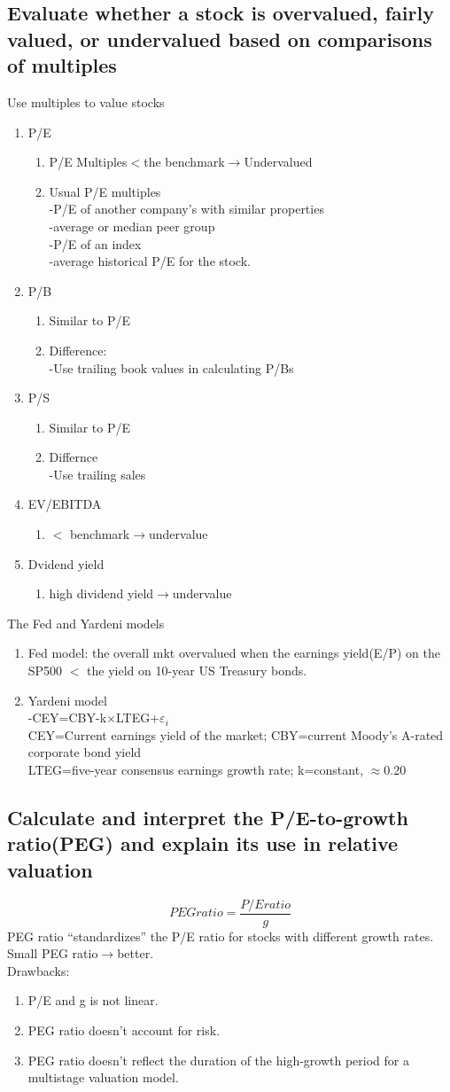 \documentclass{article}
\newcommand{\be}{\begin{enumerate}}
\newcommand{\ee}{\end{enumerate}}
\newcommand{\ra}{$\rightarrow$}
\begin{document}
\subsection{Evaluate whether a stock is overvalued, fairly valued, or undervalued based on comparisons
of multiples}
Use multiples to value stocks
\be
\item P/E
\be
    \item P/E Multiples$<$the benchmark\ra Undervalued
    \item Usual P/E multiples
        \\-P/E of another company's with similar properties
        \\-average or median peer group
        \\-P/E of an index
        \\-average historical P/E for the stock.
\ee
\item P/B
\be
    \item Similar to P/E
    \item Difference:
        \\-Use trailing book values in calculating P/Bs
\ee
\item P/S
\be
    \item Similar to P/E
    \item Differnce
        \\-Use trailing sales
\ee
\item EV/EBITDA
\be
    \item $<$ benchmark\ra undervalue
\ee
\item Dvidend yield
\be
    \item high dividend yield\ra undervalue
\ee
\ee
The Fed and Yardeni models
\be
    \item Fed model: the overall mkt overvalued when the earnings yield(E/P) on
        the SP500 $<$ the yield on 10-year US Treasury bonds.
    \item Yardeni model
        \\-CEY=CBY-k$\times$LTEG+$\varepsilon_i$
        \\CEY=Current earnings yield of the market; CBY=current Moody's A-rated
        corporate bond yield
        \\LTEG=five-year consensus earnings growth rate; k=constant, $\approx$0.20
\ee
\subsection{Calculate and interpret the P/E-to-growth ratio(PEG) and explain its use
in relative valuation}
$$
PEG ratio = \frac{P/E ratio}{g}
$$
PEG ratio ``standardizes'' the P/E ratio for stocks with different growth rates.
Small PEG ratio\ra better.
\\Drawbacks:
\be
    \item P/E and g is not linear.
    \item PEG ratio doesn't account for risk.
    \item PEG ratio doesn't reflect the duration of the high-growth period
        for a multistage valuation model.
\ee
\end{document}
